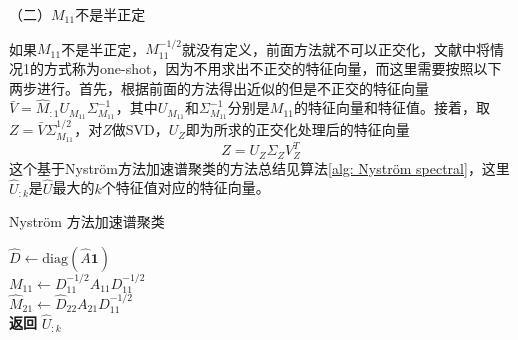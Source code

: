 （二）$M_{11}$不是半正定

如果$M_{11}$不是半正定，$M_{11}^{-1/2}$就没有定义，前面方法就不可以正交化，文献\cite{fowlkes2004spectral}中将情况1的方式称为one-shot，因为不用求出不正交的特征向量，而这里需要按照以下两步进行。首先，根据前面的方法得出近似的但是不正交的特征向量$\bar{V} = \hat{M}_{:1}U_{M_{11}}\Sigma_{M_{11}}^{-1}$，其中$U_{M_{11}}$和$\Sigma_{M_{11}}^{-1}$分别是$M_{11}$的特征向量和特征值。接着，取$Z = \bar{V}\Sigma_{M_{11}}^{1/2}$，对$Z$做SVD，$U_Z$即为所求的正交化处理后的特征向量
\begin{equation*}
    Z = U_{Z}\Sigma_{Z}V_Z^T
\end{equation*}
这个基于Nyström方法加速谱聚类的方法总结见算法\ref{alg: Nyström spectral}，这里$\hat{U}_{:k}$是$\hat{U}$最大的$k$个特征值对应的特征向量。
\begin{algorithm}
    \caption{Nyström 方法加速谱聚类}\label{alg: Nyström spectral}
    $\hat{D} \gets \text{diag}(\hat{A}\mathbf{1})$\\
    $M_{11} \gets D_{11}^{-1/2}A_{11}D_{11}^{-1/2}$ \\
    $\hat{M}_{21} \gets \hat{D}_{22}A_{21}D_{11}^{-1/2}$ \\
    \textbf{返回} $\hat{U}_{:k}$
\end{algorithm}